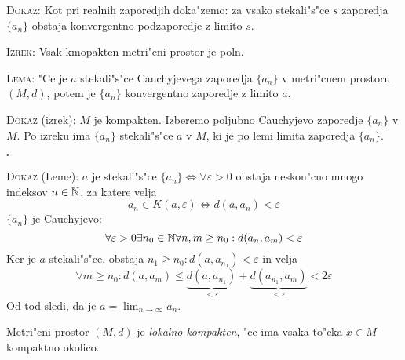 \textsc{Dokaz:} Kot pri realnih zaporedjih doka"zemo: za vsako stekali"s"ce $s$ zaporedja $\{ a_n \}$ obstaja konvergentno podzaporedje z limito $s$.

\textsc{Izrek:} Vsak kmopakten metri"cni prostor je poln.

\textsc{Lema:} "Ce je $a$ stekali"s"ce Cauchyjevega zaporedja $\{ a_n \}$ v metri"cnem prostoru $(M, d)$, potem je $\{ a_n \}$ konvergentno zaporedje z limito $a$.

\textsc{Dokaz} (izrek): $M$ je kompakten. Izberemo poljubno Cauchyjevo zaporedje $\{ a_n \}$ v $M$. Po izreku ima $\{ a_n \}$ stekali"s"ce $a$ v $M$, ki je po lemi limita zaporedja $\{ a_n \}$.

\hfill $\square$

\textsc{Dokaz} (Leme): $a$ je stekali"s"ce $\{ a_n \} \iff \forall \varepsilon > 0$ obstaja neskon"cno mnogo indeksov $n \in \mathbb{N}$, za katere velja
\begin{equation*}
a_n \in K(a, \varepsilon) \iff d(a, a_n) < \varepsilon
\end{equation*}
$\{a_n\}$ je Cauchyjevo:
\begin{equation*}
\forall \varepsilon > 0 \exists n_0 \in \mathbb{N} \forall n, m \geq n_0: d(a_n, a_m) < \varepsilon
\end{equation*}
Ker je $a$ stekali"s"ce, obstaja $n_1 \geq n_0: d(a, a_{n_1}) < \varepsilon$ in velja
\begin{equation*}
\forall m \geq n_0: d(a, a_m) \leq \underbrace{d(a, a_{n_1})}_{< \varepsilon} + \underbrace{d(a_{n_1}, a_m)}_{< \varepsilon} < 2 \varepsilon
\end{equation*}
Od tod sledi, da je $a = \lim_{n \to \infty} a_n$.

 Metri"cni prostor $(M, d)$ je \emph{lokalno kompakten}, "ce ima vsaka to"cka $x \in M$ kompaktno okolico.
